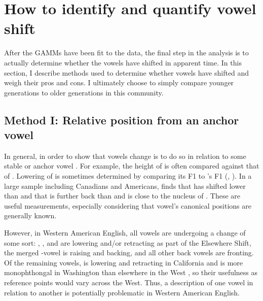\section{How to identify and quantify vowel shift}
\label{how_shifting_is_measured}

After the GAMMs have been fit to the data, the final step in the analysis is to actually determine whether the vowels have shifted in apparent time. In this section, I describe methods used to determine whether vowels have shifted and weigh their pros and cons. I ultimately choose to simply compare younger generations to older generations in this community.

\subsection{Method I: Relative position from an anchor vowel}

In general, in order to show that vowels change is to do so in relation to some stable or anchor vowel \citep[103--104]{dipaolo_etal_2011}. For example, the height of \trap is often compared against that of \lot \citep[20]{thomas_2001}. Lowering of \bit is sometimes determined by comparing its F1 to \face's F1 (\citealt[44]{kennedy_grama_2012}, \citealt[97]{bowie_2017_pads}). In a large sample including Canadians and Americans, \citet{boberg_2019} finds that \kit has shifted lower than \face and that \trap is further back than \goose and is close to the nucleus of \mouth. These are useful measurements, especially considering that vowel’s canonical positions are generally known.

However, in Western American English, all vowels are undergoing a change of some sort: \kit, \dress, and \trap are lowering and/or retracting as part of the Elsewhere Shift, the merged \lot-\thought vowel is raising and backing, and all other back vowels are fronting. Of the remaining vowels, \fleece is lowering and retracting in California \citep{donofrio_etal_2019} and \face is more monophthongal in Washington than elsewhere in the West \citep{wassink_2015}, so their usefulness as reference points would vary across the West. Thus, a description of one vowel in relation to another is potentially problematic in Western American English.

